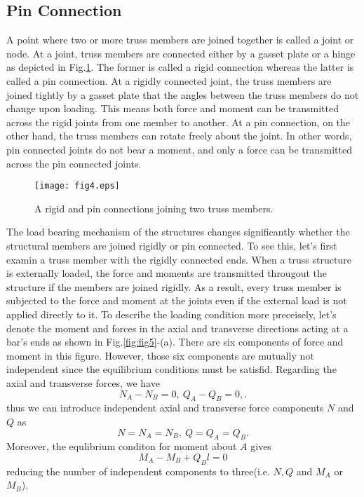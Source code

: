 \documentclass[10pt,a4j]{article}
\begin{document}
\subsection{Pin Connection}
A point where two or more truss members are joined together is called a joint or node. 
At a joint, truss members are connected either by a gasset plate or a hinge as depicted 
in Fig.\ref{fig:fig4}. The former is called a rigid connection whereas the latter is called 
a pin connection. At a rigidly connected joint, the truss members are joined 
tightly by a gasset plate that the angles between the truss members do not 
change upon loading. This means both force and moment can be transmitted across 
the rigid joints from one member to another. 
At a pin connection, on the other hand, the truss members can rotate freely about 
the joint. In other words, pin connected joints do not bear a moment, and 
only a force can be transmitted across the pin connected joints. 
\begin{figure}[h]
	\begin{center}
	\texttt{[image: fig4.eps]} 
	\end{center}
	\caption{A rigid and pin connections joining two truss members.} 
	\label{fig:fig4}
\end{figure}

The load bearing mechanism of the structures changes significantly whether the 
structural members are joined rigidly or pin connected. To see this, let's first 
examin a truss member with the rigidly connected ends. When a truss structure is externally loaded, 
the force and moments are transmitted througout the structure if the 
members are joined rigidly. As a result, every truss member is subjected to 
the force and moment at the joints even if the external load is not applied 
directly to it. To describe the loading condition more preceisely, let's 
denote the moment and forces in the axial and transverse directions 
acting at a bar's ends as shown in Fig.\ref{fig:fig5}-(a). 
There are six components of force and moment in this figure. 
However, those six components are  mutually not  independent since 
the equilibrium conditions must be satisfid. 
Regarding the axial and transverse forces, we have 
\begin{equation}
	N_A-N_B=0, \ Q_A-Q_B=0, .
	\label{eqn:}
\end{equation}
thus we can introduce independent axial and transverse force components $N$ and $Q$ as
\begin{equation}
	N=N_A=N_B,\  Q=Q_A=Q_B.
	\label{eqn:}
\end{equation}
Moreover, the equlibrium conditon for moment about $A$ gives 
\begin{equation}
	M_A-M_B+Q_Bl=0 
	\label{eqn:equib_Mab}
\end{equation}
reducing the number of independent components to three(i.e. $N,Q$ and $M_A$ or $M_B$).\\
\end{document}
